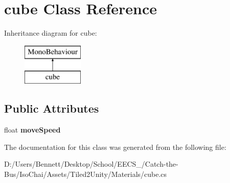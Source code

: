 \hypertarget{classcube}{}\section{cube Class Reference}
\label{classcube}
Inheritance diagram for cube\+:\begin{figure}[H]
\begin{center}
\leavevmode
\includegraphics[height=2.000000cm]{classcube}
\end{center}
\end{figure}
\subsection*{Public Attributes}
\begin{DoxyCompactItemize}
\item 
\mbox{\label{classcube_a07418155a0ab3c3208d92dd5d218ead4}} 
float {\bfseries move\+Speed}
\end{DoxyCompactItemize}


The documentation for this class was generated from the following file\+:\begin{DoxyCompactItemize}
\item 
D\+:/\+Users/\+Bennett/\+Desktop/\+School/\+E\+E\+C\+S\+\_/\+Catch-\/the-\/\+Bus/\+Iso\+Chai/\+Assets/\+Tiled2\+Unity/\+Materials/cube.\+cs\end{DoxyCompactItemize}
